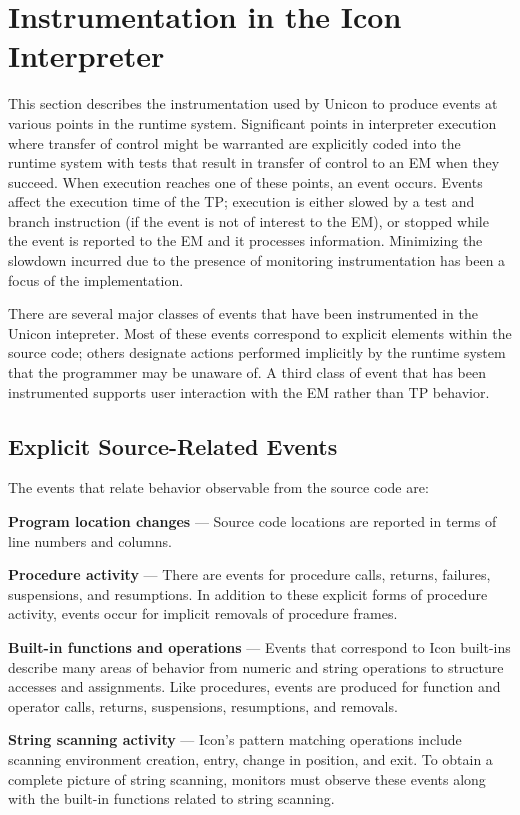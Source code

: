 \section{Instrumentation in the Icon Interpreter}

This section describes the instrumentation used by Unicon to produce
events at various points in the runtime system.  Significant points in
interpreter execution where transfer of control might be warranted are
explicitly coded into the runtime system with tests that result in
transfer of control to an EM when they succeed.  When execution reaches
one of these points, an event occurs.  Events affect the execution
time of the TP; execution is either slowed by a test and branch
instruction (if the event is not of interest to the EM), or stopped
while the event is reported to the EM and it processes information.
Minimizing the slowdown incurred due to the presence of monitoring
instrumentation has been a focus of the implementation.

There are several major classes of events that have been instrumented
in the Unicon intepreter.  Most of these events correspond to explicit
elements within the source code; others designate actions performed
implicitly by the runtime system that the programmer may be unaware of.
A third class of event that has been instrumented supports user
interaction with the EM rather than TP behavior.

\subsection*{Explicit Source-Related Events}

The events that relate behavior observable from the source code are:

\begin{list}{}{\itemsep 7pt} %
\item [{\bf Program location changes}] --- Source code locations are
	reported in terms of line numbers and columns.
\item [{\bf Procedure activity}] --- There are events for procedure calls,
	returns, failures, suspensions,
	and resumptions.  In addition to these explicit forms of
	procedure activity, events occur for implicit removals of
	procedure frames.
\item [{\bf Built-in functions and operations}] --- Events that correspond
	to Icon built-ins describe many areas of behavior from numeric and
	string operations to structure accesses	and assignments.
	Like procedures, events are produced for function and operator calls,
	returns, suspensions, resumptions, and removals.
\item [{\bf String scanning activity}] --- Icon's pattern matching
	operations include scanning environment
	creation, entry, change in position, and exit.  To obtain
	a complete picture of string scanning, monitors must
	observe these events along with the built-in functions
	related to string scanning.
\end{list}

